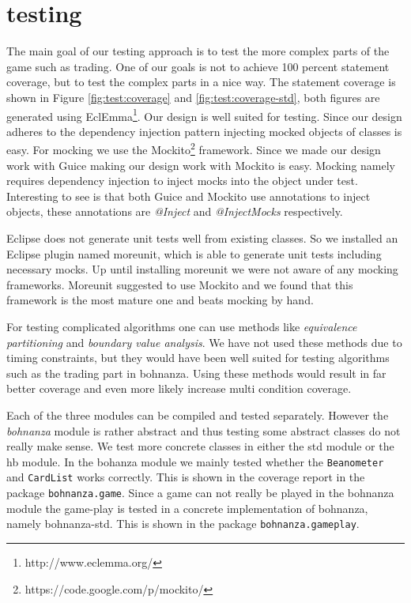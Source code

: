 \section{testing}
The main goal of our testing approach is to test the more complex parts of the game such as
trading. One of our goals is not to achieve 100 percent statement coverage, but to test the complex parts
in a nice way. The statement coverage is shown in Figure \ref{fig:test:coverage} and \ref{fig:test:coverage-std}, both figures are
generated using EclEmma\footnote{http://www.eclemma.org/}. Our design is well suited for testing.
Since our design adheres to the dependency injection pattern injecting mocked objects of classes is easy. For mocking we use the Mockito\footnote{https://code.google.com/p/mockito/} framework. Since
we made our design work with Guice making our design work with Mockito is easy. Mocking namely requires dependency injection to inject
mocks into the object under test. Interesting to see is that both Guice and Mockito use annotations to inject objects, these annotations are
\emph{@Inject} and \emph{@InjectMocks} respectively.

Eclipse does not generate unit tests well from existing classes. So we installed an
Eclipse plugin named moreunit, which is able to generate unit tests including necessary mocks. Up until installing moreunit we were not
aware of any mocking frameworks. Moreunit suggested to use Mockito and we found that this framework is the most mature one and beats
mocking by hand.

For testing complicated algorithms one can use methods like \emph{equivalence partitioning} and \emph{boundary value analysis}. We have not
used these methods due to timing constraints, but they would have been well suited for testing algorithms such as the trading part in
bohnanza. Using these methods would result in far better coverage and even more likely increase multi condition coverage.

Each of the three modules can be compiled and tested separately.
However the \emph{bohnanza} module is rather abstract and thus testing some abstract classes do not really make sense. We test
more concrete classes in either the \gls{std} module or the \gls{hb} module.
In the bohanza module we mainly tested whether the \texttt{Beanometer} and \texttt{CardList}
works correctly. This is shown in the coverage report in the package \texttt{bohnanza.game}. Since a
game can not really be played in the bohnanza module the game-play is tested in a concrete
implementation of bohnanza, namely bohnanza-std. This is shown in the package
\texttt{bohnanza.gameplay}.

